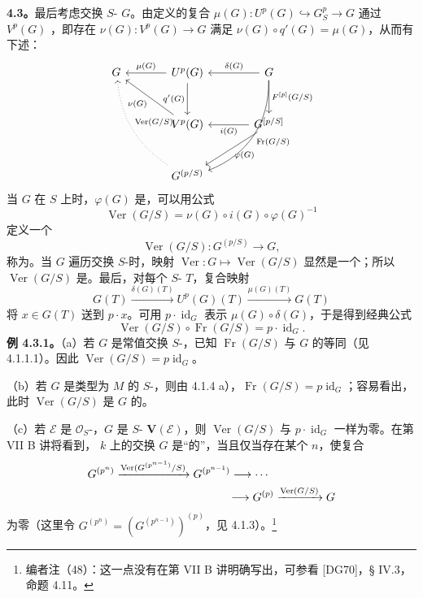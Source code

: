 \textbf{4.3。}最后考虑交换 $S$- $G$。由定义的复合 $\mu(G):U^p(G)\hookrightarrow G_S^p\to G$ 通过 $V^p(G)$ ，即存在 $\nu(G):V^p(G)\to G$ 满足 $\nu(G)\circ q'(G)=\mu(G)$，从而有下述：
\[
\begin{tikzcd}[column sep=large,row sep=large]
G&U^p(G)\arrow[l,"\mu(G)"']\arrow[d,"q'(G)"']&G\arrow[l,"\delta(G)"']\arrow[d,"{F^{[p]}(G/S)}"]\arrow[ddl,bend left=35,"\operatorname{Fr}(G/S)"]\\
&V^p(G)\arrow[ul,"\nu(G)"]&G^{[p/S]}\arrow[l,"i(G)"]\arrow[dl,"\varphi(G)"]\\
&G^{(p/S)}\arrow[uul,dotted,bend left=25,"\operatorname{Ver}(G/S)"']&
\end{tikzcd}
\]
当 $G$ 在 $S$ 上时，$\varphi(G)$ 是，可以用公式
\[
\operatorname{Ver}(G/S)=\nu(G)\circ i(G)\circ\varphi(G)^{-1}
\]
定义一个
\[
\operatorname{Ver}(G/S):G^{(p/S)}\longrightarrow G,
\]
称为。当 $G$ 遍历交换 $S$-时，映射 $\operatorname{Ver}:G\mapsto\operatorname{Ver}(G/S)$ 显然是一个；所以 $\operatorname{Ver}(G/S)$ 是。最后，对每个 $S$- $T$，复合映射
\[
G(T)\xrightarrow{\delta(G)(T)}U^p(G)(T)\xrightarrow{\mu(G)(T)}G(T)
\]
将 $x\in G(T)$ 送到 $p\cdot x$。可用 $p\cdot\operatorname{id}_G$ 表示 $\mu(G)\circ\delta(G)$，于是得到经典公式
\[
\operatorname{Ver}(G/S)\circ\operatorname{Fr}(G/S)=p\cdot\operatorname{id}_G.\tag{$*$}
\]
\textbf{例 4.3.1。}（a）若 $G$ 是常值交换 $S$-，已知 $\operatorname{Fr}(G/S)$ 与 $G$ 的等同（见 4.1.1.1）。因此 $\operatorname{Ver}(G/S)=p\operatorname{id}_G$。

（b）若 $G$ 是类型为 $M$ 的 $S$-，则由 4.1.4 a），$\operatorname{Fr}(G/S)=p\operatorname{id}_G$；容易看出，此时 $\operatorname{Ver}(G/S)$ 是 $G$ 的。

（c）若 $\mathcal E$ 是 $\mathcal O_S$-，$G$ 是 $S$- $\mathbf V(\mathcal E)$，则 $\operatorname{Ver}(G/S)$ 与 $p\cdot\operatorname{id}_G$ 一样为零。在第 VII B 讲将看到， $k$ 上的交换 $G$ 是“的”，当且仅当存在某个 $n$，使复合
\[
\begin{aligned}
G^{(p^n)}&\xrightarrow{\operatorname{Ver}(G^{(p^{n-1})}/S)}G^{(p^{n-1})}\longrightarrow\cdots\\
&\hspace{35mm}\longrightarrow G^{(p)}\xrightarrow{\operatorname{Ver}(G/S)}G
\end{aligned}
\]
为零（这里令 $G^{(p^n)}=(G^{(p^{n-1})})^{(p)}$，见 4.1.3）。\footnote{编者注（48）：这一点没有在第 VII B 讲明确写出，可参看 [DG70]，§ IV.3，命题 4.11。}

